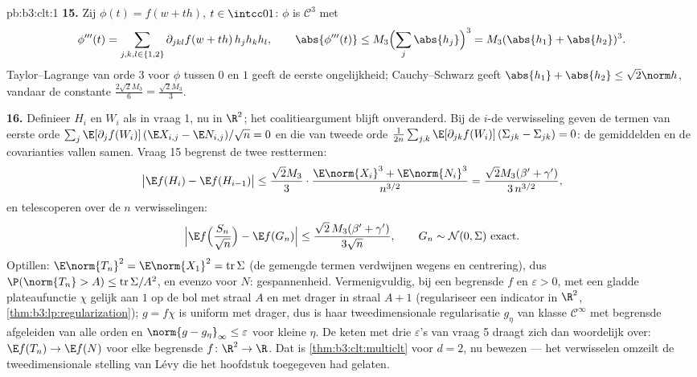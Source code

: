 \begin{solution}{pb:b3:clt:1}
\textbf{15.} Zij $\phi(t) = f(w + th)$, $t \in \intcc01$:
$\phi$ is $\mathcal C^3$ met
\[
\phi'''(t) = \sum_{j,k,l\in\{1,2\}}\partial_{jkl}f(w +
th)\,h_jh_kh_l, \qquad \abs{\phi'''(t)} \leq
M_3\Bigl(\sum_j\abs{h_j}\Bigr)^3 = M_3(\abs{h_1} +
\abs{h_2})^3 .
\]
Taylor--Lagrange van orde $3$ voor $\phi$ tussen $0$ en $1$
geeft de eerste ongelijkheid; Cauchy--Schwarz geeft
$\abs{h_1} + \abs{h_2} \leq \sqrt2\norm h$, vandaar de
constante $\frac{2\sqrt2M_3}6 = \frac{\sqrt2M_3}3$.

\textbf{16.} Definieer $H_i$ en $W_i$ als in vraag 1, nu in
$\R^2$; het coalitieargument blijft onveranderd. Bij de
$i$-de verwisseling geven de termen van eerste orde
$\sum_j\E[\partial_jf(W_i)]\,(\E X_{i,j} - \E N_{i,j})/
\sqrt n = 0$ en die van tweede orde
$\frac1{2n}\sum_{j,k}\E[\partial_{jk}f(W_i)]\,(\Sigma_{jk}
- \Sigma_{jk}) = 0$: de gemiddelden en de covarianties
vallen samen. Vraag 15 begrenst de twee resttermen:
\[
\bigl|\E f(H_i) - \E f(H_{i-1})\bigr| \leq
\frac{\sqrt2M_3}3\cdot\frac{\E\norm{X_i}^3 +
\E\norm{N_i}^3}{n^{3/2}}
= \frac{\sqrt2M_3(\beta' + \gamma')}{3\,n^{3/2}},
\]
en telescoperen over de $n$ verwisselingen:
\[
\Bigl|\E f\Bigl(\frac{S_n}{\sqrt n}\Bigr) - \E
f(G_n)\Bigr| \leq \frac{\sqrt2\,M_3(\beta' +
\gamma')}{3\sqrt n},
\qquad G_n \sim \mathcal N(0, \Sigma)\ \text{exact} .
\]
Optillen: $\E\norm{T_n}^2 = \E\norm{X_1}^2 =
\operatorname{tr}\Sigma$ (de gemengde termen verdwijnen
wegens  en centrering), dus
$\P(\norm{T_n} > A) \leq \operatorname{tr}\Sigma/A^2$, en
evenzo voor $N$: gespannenheid. Vermenigvuldig, bij een
begrensde  $f$ en $\varepsilon > 0$, met een gladde
plateaufunctie $\chi$ gelijk aan $1$ op de bol met straal
$A$ en met drager in straal $A + 1$ (regulariseer een
indicator in $\R^2$, \cref{thm:b3:lp:regularization}); $g =
f\chi$ is uniform  met  drager, dus is haar
tweedimensionale regularisatie $g_\eta$ van klasse
$\mathcal C^\infty$ met begrensde afgeleiden van alle orden
en $\norm{g - g_\eta}_\infty \leq \varepsilon$ voor kleine
$\eta$. De keten met drie $\varepsilon$'s van vraag 5 draagt
zich dan woordelijk over: $\E f(T_n) \to \E f(N)$ voor elke
begrensde  $f \colon \R^2 \to \R$. Dat is
\cref{thm:b3:clt:multiclt} voor $d = 2$, nu bewezen --- het
verwisselen omzeilt de tweedimensionale stelling van Lévy
die het hoofdstuk toegegeven had gelaten.


\end{solution}
